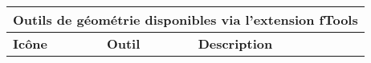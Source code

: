 \begin{table}[ht]
\centering
\begin{tabular}{|m{1cm}|m{3cm}|m{12cm}|}
 \hline \multicolumn{3}{|c|}{\textbf{Outils de géométrie disponibles via l'extension fTools}} \\
 \hline \textbf{Icône} & \textbf{Outil} & \textbf{Description} \\

\end{tabular}
\end{table}
